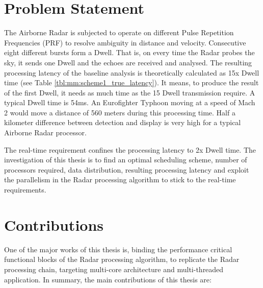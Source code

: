 \section{Problem Statement}
\label{sec:intro:probstatement}
The Airborne Radar is subjected to operate on different Pulse Repetition Frequencies (PRF) to resolve ambiguity in distance and velocity. Consecutive eight different bursts form a Dwell. That is, on every time the Radar probes the sky, it sends one Dwell and the echoes are received and analysed. The resulting processing latency of the baseline analysis is theoretically calculated as 15x Dwell time (see Table \ref{tbl:mm:scheme1_true_latency}).  It means, to produce the result of the first Dwell, it needs as much time as the 15 Dwell transmission require. A typical Dwell time is 54ms. An Eurofighter Typhoon moving at a speed of Mach 2 would move a distance of 560 meters during this processing time. Half a kilometer difference between detection and display is very high for a typical Airborne Radar processor.

The real-time requirement confines the processing latency to 2x Dwell time. The investigation of this thesis is to find an optimal scheduling scheme, number of processors required, data distribution, resulting processing latency and exploit the parallelism in the Radar processing algorithm to stick to the real-time requirements.

\section{Contributions}
\label{sec:intro:contrib}
One of the major works of this thesis is, binding the performance critical functional blocks of the Radar processing algorithm, to replicate the Radar processing chain, targeting multi-core architecture and multi-threaded application. In summary, the main contributions of this thesis are:

